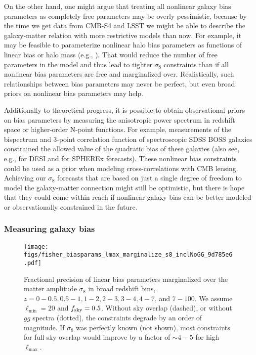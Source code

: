 \documentclass[prd,superscriptaddress,floatfix,notitlepage,nofootinbib,reprint]{revtex4-1} %
\begin{document}
On the other hand, one might argue that treating all nonlinear galaxy bias parameters as  completely free parameters may be overly pessimistic, because by the time we get data from CMB-S4 and LSST we might be able to describe the galaxy-matter relation with more restrictive models than now.
For example, it may be feasible to parameterize nonlinear halo bias parameters as functions of linear bias or halo mass (e.g., \cite{Lazeyras1511,Baldauf1511,Castorina1611}).
That would reduce the number of free parameters in the model and thus lead to tighter $\sigma_8$ constraints than if all nonlinear bias parameters are free and marginalized over.
Realistically, such relationships between bias parameters may never be perfect, but even broad priors on nonlinear bias parameters may help.


Additionally to theoretical progress, it is possible to obtain observational priors on bias parameters by measuring the anisotropic power spectrum in redshift space or higher-order N-point functions. 
For example, measurements of the bispectrum \cite{Gil-Marin:2014sta} and 3-point correlation function \cite{Slepian:2015hca} of spectroscopic SDSS BOSS galaxies constrained the allowed value of the quadratic bias of these galaxies (also see, e.g., \cite{SongTaruyaOka1502} for DESI and \cite{Spherex1412} for SPHEREx forecasts).
These nonlinear bias constraints could be used as a prior when modeling cross-correlations with CMB lensing.
Achieving our $\sigma_8$ forecasts that are based on just a single degree of freedom to model the galaxy-matter connection might still be optimistic, but there is hope that they could come within reach if nonlinear galaxy bias can be better modeled or observationally constrained in the future.





\subsubsection{Measuring galaxy bias}

\begin{figure}[tbp]
\texttt{[image: figs/fisher\_biasparams\_lmax\_marginalize\_s8\_inclNoGG\_9d785e6.pdf]}
\caption{Fractional precision of linear bias parameters marginalized over the matter amplitude $\sigma_8$ in broad redshift bins, $z=0-0.5,0.5-1,1-2,2-3,3-4,4-7$, and $7-100$. 
We assume $\ell_\mathrm{min}=20$ and ${f_\mathrm{sky}}=0.5$.
Without sky overlap (dashed), or without $gg$ spectra (dotted), the constraints degrade by an order of magnitude.
If $\sigma_8$ was perfectly known (not shown), most constraints for full sky overlap would improve by a factor of $\sim 4-5$ for high $\ell_\mathrm{max}$.
}
\label{fig:biasparams_lmax_marginalize_s8}
\end{figure}
\end{document}
